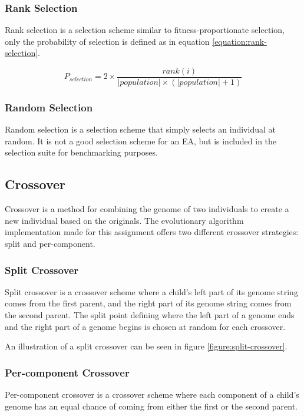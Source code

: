 \documentclass[twocolumn,oneside]{amsart}
\begin{document}
\subsubsection{Rank Selection}

Rank selection is a selection scheme similar to fitness-proportionate selection, only the probability of selection is defined as in equation \ref{equation:rank-selection}.

\begin{equation}\label{equation:rank-selection}
P_{selection} = 2 \times
\frac{rank(i)}
{| population | \times (| population | + 1)}
\end{equation}

\subsubsection{Random Selection}
Random selection is a selection scheme that simply selects an individual at random.
It is not a good selection scheme for an EA, but is included in the selection suite for benchmarking purposes.

\subsection{Crossover}
Crossover is a method for combining the genome of two individuals to create a new individual based on the originals.
The evolutionary algorithm implementation made for this assignment offers two different crossover strategies: split and per-component.

\subsubsection{Split Crossover}
Split crossover is a crossover scheme where a child's left part of its genome string comes from the first parent, and the right part of its genome string comes from the second parent.
The split point defining where the left part of a genome ends and the right part of a genome begins is chosen at random for each crossover.

An illustration of a split crossover can be seen in figure \ref{figure:split-crossover}.


\subsubsection{Per-component Crossover}
Per-component crossover is a crossover scheme where each component of a child's genome has an equal chance of coming from either the first or the second parent.
\end{document}
